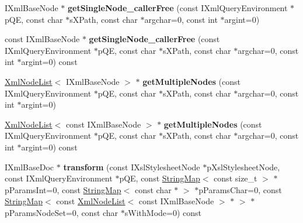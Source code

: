 \begin{DoxyCompactItemize}
\item 
\hypertarget{classgeneral__server_1_1XmlBaseDoc_af26c64cace79a9060881e9943bde5ce8}{\-I\-Xml\-Base\-Node $\ast$ {\bfseries get\-Single\-Node\-\_\-caller\-Free} (const \-I\-Xml\-Query\-Environment $\ast$p\-Q\-E, const char $\ast$s\-X\-Path, const char $\ast$argchar=0, const int $\ast$argint=0)}\label{classgeneral__server_1_1XmlBaseDoc_af26c64cace79a9060881e9943bde5ce8}

\item 
\hypertarget{classgeneral__server_1_1XmlBaseDoc_a6a32a99fd43b9b2aa5571ff0e6057b38}{const \-I\-Xml\-Base\-Node $\ast$ {\bfseries get\-Single\-Node\-\_\-caller\-Free} (const \-I\-Xml\-Query\-Environment $\ast$p\-Q\-E, const char $\ast$s\-X\-Path, const char $\ast$argchar=0, const int $\ast$argint=0) const }\label{classgeneral__server_1_1XmlBaseDoc_a6a32a99fd43b9b2aa5571ff0e6057b38}

\item 
\hypertarget{classgeneral__server_1_1XmlBaseDoc_a39a1e960b4df5547b2047a9f470a6257}{\hyperlink{classgeneral__server_1_1XmlNodeList}{\-Xml\-Node\-List}$<$ \-I\-Xml\-Base\-Node $>$ $\ast$ {\bfseries get\-Multiple\-Nodes} (const \-I\-Xml\-Query\-Environment $\ast$p\-Q\-E, const char $\ast$s\-X\-Path, const char $\ast$argchar=0, const int $\ast$argint=0)}\label{classgeneral__server_1_1XmlBaseDoc_a39a1e960b4df5547b2047a9f470a6257}

\item 
\hypertarget{classgeneral__server_1_1XmlBaseDoc_a387c1704e870141f5e226f510e2666f1}{\hyperlink{classgeneral__server_1_1XmlNodeList}{\-Xml\-Node\-List}$<$ const \-I\-Xml\-Base\-Node $>$ $\ast$ {\bfseries get\-Multiple\-Nodes} (const \-I\-Xml\-Query\-Environment $\ast$p\-Q\-E, const char $\ast$s\-X\-Path, const char $\ast$argchar=0, const int $\ast$argint=0) const }\label{classgeneral__server_1_1XmlBaseDoc_a387c1704e870141f5e226f510e2666f1}

\item 
\hypertarget{classgeneral__server_1_1XmlBaseDoc_af31bc4db31494e426b866da4d27a3435}{\-I\-Xml\-Base\-Doc $\ast$ {\bfseries transform} (const \-I\-Xsl\-Stylesheet\-Node $\ast$p\-Xsl\-Stylesheet\-Node, const \-I\-Xml\-Query\-Environment $\ast$p\-Q\-E, const \hyperlink{classgeneral__server_1_1StringMap}{\-String\-Map}$<$ const size\-\_\-t $>$ $\ast$p\-Params\-Int=0, const \hyperlink{classgeneral__server_1_1StringMap}{\-String\-Map}$<$ const char $\ast$ $>$ $\ast$p\-Params\-Char=0, const \hyperlink{classgeneral__server_1_1StringMap}{\-String\-Map}$<$ const \hyperlink{classgeneral__server_1_1XmlNodeList}{\-Xml\-Node\-List}$<$ const \-I\-Xml\-Base\-Node $>$ $\ast$ $>$ $\ast$p\-Params\-Node\-Set=0, const char $\ast$s\-With\-Mode=0) const }\label{classgeneral__server_1_1XmlBaseDoc_af31bc4db31494e426b866da4d27a3435}


\end{DoxyCompactItemize}
